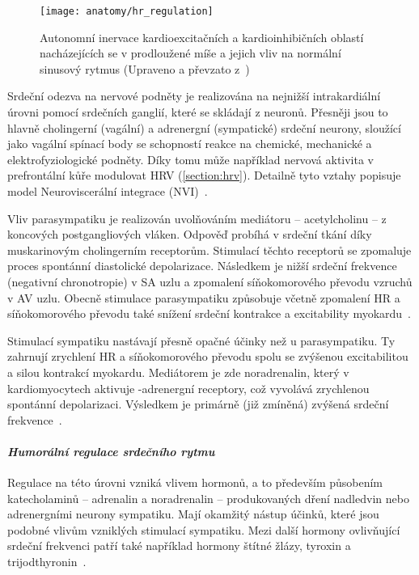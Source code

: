 \begin{figure}[h]
	\begin{center}
		\texttt{[image: anatomy/hr\_regulation]}
		\caption{Autonomní inervace kardioexcitačních a kardioinhibičních
			oblastí nacházejících se v prodloužené míše a jejich vliv na
			normální sinusový rytmus (Upraveno a převzato z~\cite{OpenStax})}
		\label{fig:hr_regulation}
	\end{center}
\end{figure}

Srdeční odezva na nervové podněty je realizována na nejnižší intrakardiální
úrovni pomocí srdečních ganglií, které se skládají z neuronů. Přesněji jsou to
hlavně cholingerní (vagální) a adrenergní (sympatické) srdeční neurony, sloužící
jako vagální spínací body se schopností reakce na chemické, mechanické a
elektrofyziologické podněty. Díky tomu může například nervová aktivita v
prefrontální kůře modulovat HRV (\ref{section:hrv}). Detailně tyto vztahy
popisuje model Neuroviscerální integrace (NVI)~\cite{Smith2017}.

Vliv parasympatiku je realizován uvolňováním mediátoru -- acetylcholinu -- z
koncových postgangliových vláken. Odpověď probíhá v srdeční tkání díky
muskarinovým cholingerním receptorům. Stimulací těchto receptorů se zpomaluje
proces spontánní diastolické depolarizace. Následkem je nižší srdeční frekvence
(negativní chronotropie) v SA uzlu a zpomalení síňokomorového převodu vzruchů v
AV uzlu. Obecně stimulace parasympatiku způsobuje včetně zpomalení HR a
síňokomorového převodu také snížení srdeční kontrakce a excitability
myokardu~\cite{Kittnar2020}.

Stimulací sympatiku nastávají přesně opačné účinky než u parasympatiku. Ty
zahrnují zrychlení HR a síňokomorového převodu spolu se zvýšenou excitabilitou a
silou kontrakcí myokardu. Mediátorem je zde noradrenalin, který v
kardiomyocytech aktivuje \textbeta-adrenergní receptory, což vyvolává zrychlenou
spontánní depolarizaci. Výsledkem je primárně (již zmíněná) zvýšená srdeční
frekvence~\cite{Kittnar2020}.

\paragraph*{\textit{Humorální regulace srdečního rytmu}\\} Regulace na této
úrovni vzniká vlivem hormonů, a to především působením katecholaminů --
adrenalin a noradrenalin -- produkovaných dření nadledvin nebo adrenergními
neurony sympatiku. Mají okamžitý nástup účinků, které jsou podobné vlivům
vzniklých stimulací sympatiku. Mezi další hormony ovlivňující srdeční frekvenci
patří také například hormony štítné žlázy, tyroxin a
trijodthyronin~\cite{Kittnar2020,Orel2019}.

